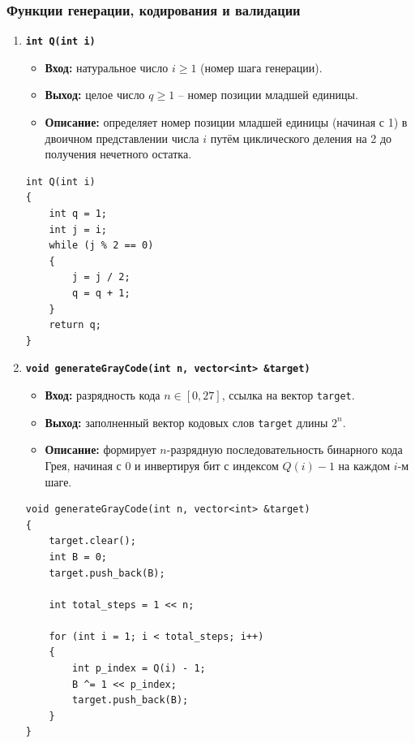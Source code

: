 \documentclass[14pt, a4paper]{extarticle}
\begin{document}
	\subsubsection*{Функции генерации, кодирования и валидации}
	\begin{enumerate}[label=\arabic*., resume]
		\item \textbf{\texttt{int Q(int i)}}
		\begin{itemize}[leftmargin=*, noitemsep]
			\item \textbf{Вход:} натуральное число $i \ge 1$ (номер шага генерации).
			\item \textbf{Выход:} целое число $q \ge 1$ -- номер позиции младшей единицы.
			\item \textbf{Описание:} определяет номер позиции младшей единицы (начиная с 1) в двоичном представлении числа $i$ путём циклического деления на 2 до получения нечетного остатка.
		\end{itemize}
		\begin{lstlisting}[caption={Функция Q(int i)}, label={lst:func_q}]
int Q(int i)
{
    int q = 1;
    int j = i;
    while (j % 2 == 0)
    {
        j = j / 2;
        q = q + 1;
    }
    return q;
}
		\end{lstlisting}
		
		\item \textbf{\texttt{void generateGrayCode(int n, vector<int> \&target)}}
		\begin{itemize}[leftmargin=*, noitemsep]
			\item \textbf{Вход:} разрядность кода $n \in [0, 27]$, ссылка на вектор \texttt{target}.
			\item \textbf{Выход:} заполненный вектор кодовых слов \texttt{target} длины $2^n$.
			\item \textbf{Описание:} формирует $n$-разрядную последовательность бинарного кода Грея, начиная с 0 и инвертируя бит с индексом $Q(i) - 1$ на каждом $i$-м шаге.
		\end{itemize}
		\begin{lstlisting}[caption={Функция generateGrayCode()}, label={lst:func_generate_gray_code}]
void generateGrayCode(int n, vector<int> &target)
{
    target.clear();
    int B = 0;
    target.push_back(B);

    int total_steps = 1 << n;

    for (int i = 1; i < total_steps; i++)
    {
        int p_index = Q(i) - 1;
        B ^= 1 << p_index;
        target.push_back(B);
    }
}
		\end{lstlisting}
		

\end{enumerate}
\end{document}
